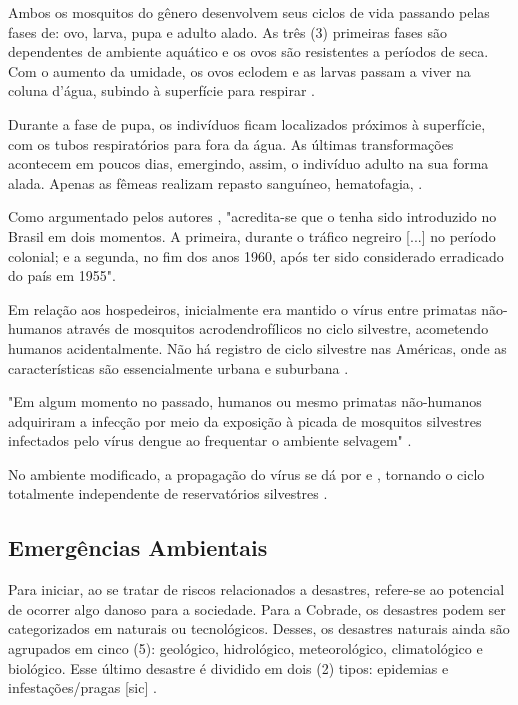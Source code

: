 \indent Ambos os mosquitos do gênero  desenvolvem seus ciclos de vida passando pelas fases de: ovo, larva, pupa e adulto alado. As três (3) primeiras fases são dependentes de ambiente aquático e os ovos são resistentes a períodos de seca. Com o aumento da umidade, os ovos eclodem e as larvas passam a viver na coluna d'água, subindo à superfície para respirar \cite{OTPCampo}.

\indent Durante a fase de pupa, os indivíduos ficam localizados próximos à superfície, com os tubos respiratórios para fora da água. As últimas transformações acontecem em poucos dias, emergindo, assim, o indivíduo adulto na sua forma alada. Apenas as fêmeas realizam repasto sanguíneo, hematofagia, \cite{OTPCampo}.

\indent Como argumentado pelos autores , "acredita-se que o  tenha sido introduzido no Brasil em dois momentos. A primeira, durante o tráfico negreiro [...] no período colonial; e a segunda, no fim dos anos 1960, após ter sido considerado erradicado do país em 1955".

\indent Em relação aos hospedeiros, inicialmente era mantido o vírus entre primatas não-humanos através de mosquitos acrodendrofílicos no ciclo silvestre, acometendo humanos acidentalmente. Não há registro de ciclo silvestre nas Américas, onde as características são essencialmente urbana e suburbana \cite{Valle2015Dengue}.

\indent "Em algum momento no passado, humanos ou mesmo primatas não-humanos adquiriram a infecção por meio da exposição à picada de mosquitos silvestres infectados pelo vírus dengue ao frequentar o ambiente selvagem" \cite{Valle2015Dengue}.

\indent No ambiente modificado, a propagação do vírus se dá por  e , tornando o ciclo totalmente independente de reservatórios silvestres \cite{Valle2015Dengue}.

\subsection{Emergências Ambientais}

\indent Para iniciar, ao se tratar de riscos relacionados a desastres, refere-se ao potencial de ocorrer algo danoso para a sociedade. Para a \acrfull{Cobrade}, os desastres podem ser categorizados em naturais ou tecnológicos. Desses, os desastres naturais ainda são agrupados em cinco (5): geológico, hidrológico, meteorológico, climatológico e biológico. Esse último desastre é dividido em dois (2) tipos: epidemias e infestações/pragas [sic]  \cite{GIRD}.

